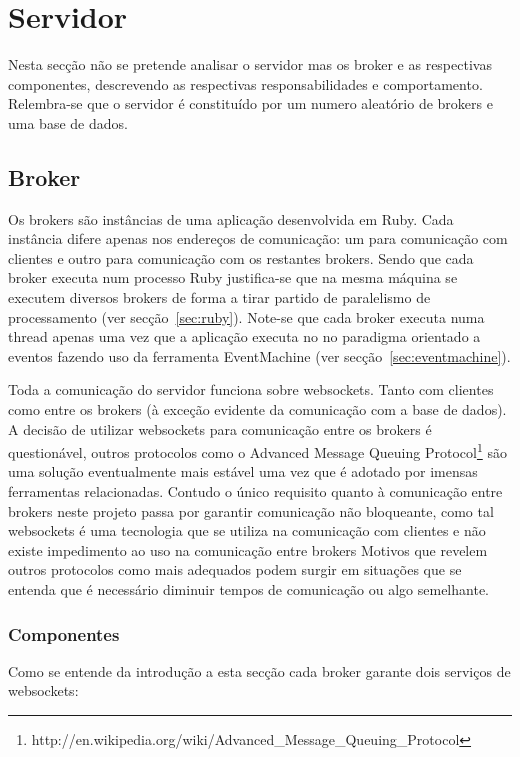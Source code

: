 \section{Servidor}

Nesta secção não se pretende analisar o servidor mas os broker e as respectivas componentes, descrevendo as respectivas responsabilidades e comportamento.
Relembra-se que o servidor é constituído por um numero aleatório de brokers e uma base de dados.

\subsection{Broker}

Os brokers são instâncias de uma aplicação desenvolvida em Ruby. Cada instância difere apenas nos endereços de comunicação: um para comunicação com clientes e outro para comunicação com os restantes brokers.
Sendo que cada broker executa num processo Ruby justifica-se que na mesma máquina se executem diversos brokers de forma a tirar partido de paralelismo de processamento (ver secção~\ref{sec:ruby}).
Note-se que cada broker executa numa thread apenas uma vez que a aplicação executa no no paradigma orientado a eventos fazendo uso da ferramenta EventMachine (ver secção~\ref{sec:eventmachine}).

Toda a comunicação do servidor funciona sobre websockets. Tanto com clientes como entre os brokers (à exceção evidente da comunicação com a base de dados). A decisão de utilizar websockets para comunicação entre os brokers é questionável, outros protocolos como o Advanced Message Queuing Protocol\footnote{http://en.wikipedia.org/wiki/Advanced\_Message\_Queuing\_Protocol} são uma solução eventualmente mais estável uma vez que é adotado por imensas ferramentas relacionadas.
Contudo o único requisito quanto à comunicação entre brokers neste projeto passa por garantir comunicação não bloqueante, como tal websockets é uma tecnologia que se utiliza na comunicação com clientes e não existe impedimento ao uso na comunicação entre brokers Motivos que revelem outros protocolos como mais adequados podem surgir em situações que se entenda que é necessário diminuir tempos de comunicação ou algo semelhante.

\subsubsection{Componentes}
Como se entende da introdução a esta secção cada broker garante dois serviços de websockets:

